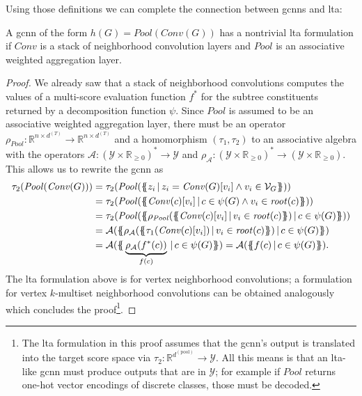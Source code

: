 Using those definitions we can complete the connection between \acp{gcnn} and \ac{lta}:
\begin{thm}\label{thm:ltag:gcnn-ltag-formulation}
	A \ac{gcnn} of the form $h(G) = \mathit{Pool}(\mathit{Conv}(G))$ has a nontrivial \ac{lta} formulation if $\mathit{Conv}$ is a stack of neighborhood convolution layers and $\mathit{Pool}$ is an associative weighted aggregation layer.
\end{thm}
\begin{proof}
	We already saw that a stack of neighborhood convolutions computes the values of a multi-score evaluation function $f^{*}$ for the subtree constituents returned by a decomposition function $\psi$.
	Since $\mathit{Pool}$ is assumed to be an associative weighted aggregation layer, there must be an operator $\rho_{\mathit{Pool}}: \mathbb{R}^{n \times d^{(T)}} \to \mathbb{R}^{n \times d^{(T)}}$ and a homomorphism $(\tau_{1}, \tau_{2})$ to an associative algebra with the operators $\mathcal{A}: {(\mathcal{Y} \times \mathbb{R}_{\geq 0})}^{*} \to \mathcal{Y}$ and $\rho_{\mathcal{A}}: {(\mathcal{Y} \times \mathbb{R}_{\geq 0})}^{*} \to {(\mathcal{Y} \times \mathbb{R}_{\geq 0})}$.
	This allows us to rewrite the \ac{gcnn} as
	\begin{align*}
		\tau_2(\mathit{Pool}(\mathit{Conv}(G)))
		&= \tau_2(\mathit{Pool}(\ldblbrace z_i\, |\, z_i = \mathit{Conv}(G)[v_i] \land v_i \in \mathcal{V}_G \rdblbrace)) \\
		&= \tau_2(\mathit{Pool}(\ldblbrace \mathit{Conv}(c)[v_i]\, |\, c \in \psi(G) \land v_i \in \mathit{root}(c) \rdblbrace)) \\
		&= \tau_2(\mathit{Pool}(\ldblbrace \rho_{\mathit{Pool}}(\ldblbrace \mathit{Conv}(c)[v_i]\, |\, v_i \in \mathit{root}(c) \rdblbrace)\, |\, c \in \psi(G) \rdblbrace)) \\
		&= \mathcal{A}(\ldblbrace \rho_{\mathcal{A}}(\ldblbrace \tau_1(\mathit{Conv}(c)[v_i])\, |\, v_i \in \mathit{root}(c) \rdblbrace)\, |\, c \in \psi(G) \rdblbrace) \\
		&= \mathcal{A}(\ldblbrace \underbrace{\rho_{\mathcal{A}}(f^{*}(c))}_{f(c)}\, |\, c \in \psi(G) \rdblbrace)
		= \mathcal{A}(\ldblbrace f(c)\, |\, c \in \psi(G) \rdblbrace)
		\text{.}
	\end{align*}
	The \ac{lta} formulation above is for vertex neighborhood convolutions;
	a formulation for vertex $k$-multiset neighborhood convolutions can be obtained analogously which concludes the proof\footnote{
		The \ac{lta} formulation in this proof assumes that the \ac{gcnn}'s output is translated into the target score space via $\tau_{2}: \mathbb{R}^{d^{(\mathrm{pool})}} \to \mathcal{Y}$.
		All this means is that an \acs{lta}-like \ac{gcnn} must produce outputs that are in $\mathcal{Y}$;
		for example if $\mathit{Pool}$ returns one-hot vector encodings of discrete classes, those must be decoded.
	}.
\end{proof}
